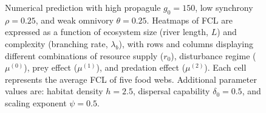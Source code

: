 \begin{figure}
\centering
{}
\caption{\label{fig:fig-num2}Numerical prediction with high propagule
\(g_0 = 150\), low synchrony \(\rho = 0.25\), and weak omnivory
\(\theta = 0.25\). Heatmaps of FCL are expressed as a function of
ecosystem size (river length, \(L\)) and complexity (branching rate,
\(\lambda_b\)), with rows and columns displaying different combinations
of resource supply (\(r_0\)), disturbance regime (\(\mu^{(0)}\)), prey
effect (\(\mu^{(1)}\)), and predation effect (\(\mu^{(2)}\)). Each cell
represents the average FCL of five food webs. Additional parameter
values are: habitat density \(h=2.5\), dispersal capability
\(\delta_0=0.5\), and scaling exponent \(\psi=0.5\).}
\end{figure}

\newpage

